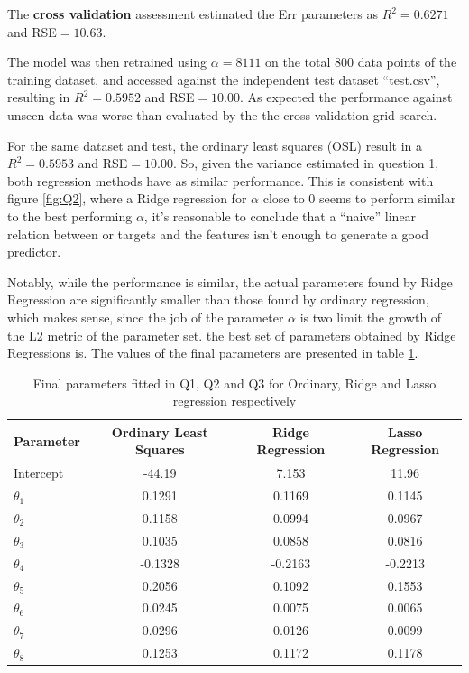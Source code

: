 \documentclass{article}
\begin{document}
  The \textbf{cross validation} assessment estimated the Err parameters as $R^2 = 0.6271$ and RSE$=10.63$.

  The model was then retrained using $\alpha=8111$ on the total 800 data points of the training dataset,
  and accessed against the independent test dataset ``test.csv'', resulting in $R^2 = 0.5952$ and
  RSE$=10.00$.   As expected the performance against unseen data was worse than evaluated by the the
  cross validation grid search.
  
  For the same dataset and test, the ordinary least squares (OSL) result in a $R^2=0.5953$
  and RSE$= 10.00$. So, given the variance estimated in question 1, both regression methods have as
  similar performance. This is consistent with figure \ref{fig:Q2}, where a Ridge regression for $\alpha$
  close to 0 seems to perform similar to the best performing $\alpha$, it's reasonable to conclude
  that a ``naive'' linear relation between or targets and the features isn't enough to generate a
  good predictor.
  
  Notably, while the performance is similar, the actual parameters found by Ridge Regression are
  significantly smaller than those found by ordinary regression, which makes sense, since the job
  of the parameter $\alpha$ is two limit the growth of the L2 metric of the parameter set.
  the best set of parameters obtained by Ridge Regressions is. The values of the final parameters
  are presented in table \ref{tab:params}.

  \begin{table}[h]
    \centering
    \begin{tabular}{l|c|c|c}
      \textbf{Parameter} & \textbf{Ordinary Least Squares} & \textbf{Ridge Regression} & \textbf{Lasso Regression} \\ \hline
      Intercept & -44.19                 & 7.153           & 11.96            \\
      $\theta_1 $ & 0.1291                 & 0.1169           & 0.1145           \\
      $\theta_2 $ & 0.1158                 & 0.0994           & 0.0967           \\
      $\theta_3 $ & 0.1035                 & 0.0858           & 0.0816           \\
      $\theta_4 $ & -0.1328                & -0.2163          & -0.2213          \\
      $\theta_5 $ & 0.2056                 & 0.1092           & 0.1553           \\
      $\theta_6 $ & 0.0245                 & 0.0075           & 0.0065           \\
      $\theta_7 $ & 0.0296                 & 0.0126           & 0.0099           \\
      $\theta_8$  & 0.1253                 & 0.1172           & 0.1178          
    \end{tabular}
    \caption{Final parameters fitted in Q1, Q2 and Q3 for Ordinary, Ridge and Lasso regression respectively}
    \label{tab:params}
  \end{table}
\end{document}
